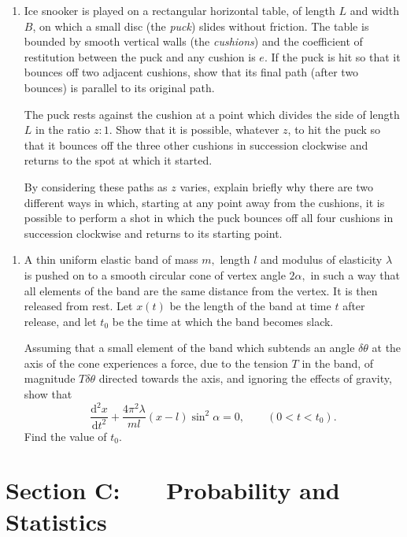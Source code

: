 \documentclass[a4, 11pt]{report}
\newlength{\qspace}
\newcounter{qnumber}
\newenvironment{question}%
 {\vspace{\qspace}
  \begin{enumerate}[\bfseries 1\quad][10]%
    \setcounter{enumi}{\value{qnumber}}%
    \item%
 }
{
  \end{enumerate}
  \filbreak
  \stepcounter{qnumber}
 }
\begin{document}
\begin{question}
Ice snooker is played on a rectangular horizontal table, of length
$L$ and width $B$, on which a small disc (the \textit{puck}) slides
without friction. The table is bounded by smooth vertical walls (the
\textit{cushions}) and the coefficient of restitution between the
puck and any cushion is $e$. If the puck is hit so that it bounces
off two adjacent cushions, show that its final path (after two bounces)
is parallel to its original path. 


The puck rests against the cushion at a point which divides the side
of length $L$ in the ratio $z:1$. Show that it is possible, whatever
$z$, to hit the puck so that it bounces off the three other cushions
in succession clockwise and returns to the spot at which it started. 


By considering these paths as $z$ varies, explain briefly why there
are two different ways in which, starting at any point away from the
cushions, it is possible to perform a shot in which the puck bounces
off all four cushions in succession clockwise and returns to its starting
point.
\end{question}
	
\begin{question}
A thin uniform elastic band of mass $m,$ length $l$ and modulus
of elasticity $\lambda$ is pushed on to a smooth circular cone of
vertex angle $2\alpha,$ in such a way that all elements of the band
are the same distance from the vertex. It is then released from rest.
Let $x(t)$ be the length of the band at time $t$ after release,
and let $t_{0}$ be the time at which the band becomes slack. 


Assuming that a small element of the band which subtends an angle
$\delta\theta$ at the axis of the cone experiences a force, due to
the tension $T$ in the band, of magnitude $T\delta\theta$ directed
towards the axis, and ignoring the effects of gravity, show that 
\[
\frac{\mathrm{d}^{2}x}{\mathrm{d}t^{2}}+\frac{4\pi^{2}\lambda}{ml}(x-l)\sin^{2}\alpha=0,\qquad(0<t<t_{0}).
\]
Find the value of $t_{0}.$ 
\end{question}
	
	\newpage
\section*{Section C: \ \ \ Probability and Statistics}
\end{document}
